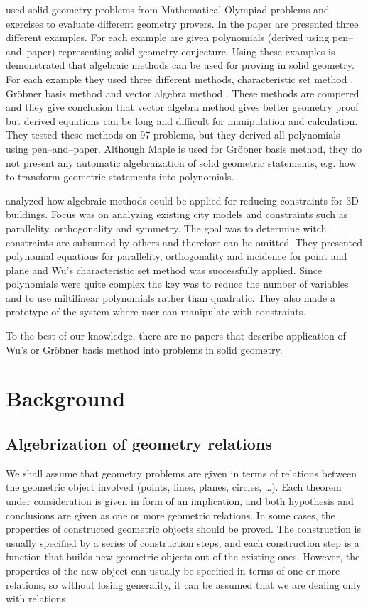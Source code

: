 \documentclass[final,1p,times,authoryear]{elsarticle}
\begin{document}
\cite{shao2016challenging} used solid geometry problems from
Mathematical Olympiad problems and exercises to evaluate different
geometry provers.  In the paper are presented three different
examples. For each example are given polynomials (derived using
pen--and--paper) representing solid geometry conjecture. Using these
examples is demonstrated that algebraic methods can be used for
proving in solid geometry. For each example they used three different
methods, characteristic set method \cite{wu}, Gr\"obner basis method
\cite{buchberger} and vector algebra method \cite{lord1985method}.
These methods are compered and they give conclusion that vector
algebra method gives better geometry proof but derived equations can
be long and difficult for manipulation and calculation. They tested
these methods on 97 problems, but they derived all polynomials using
pen--and--paper. Although Maple is used for Gr\"obner basis method,
they do not present any automatic algebraization of solid geometric
statements, e.g. how to transform geometric statements into
polynomials.

\cite{loch2009geometric} analyzed how algebraic methods could be
applied for reducing constraints for 3D buildings. Focus was on
analyzing existing city models and constraints such as parallelity,
orthogonality and symmetry.  The goal was to determine witch
constraints are subsumed by others and therefore can be omitted.  They
presented polynomial equations for parallelity, orthogonality and
incidence for point and plane and Wu's characteristic set method was
successfully applied. Since polynomials were quite complex the key was
to reduce the number of variables and to use miltilinear polynomials
rather than quadratic. They also made a prototype of the system where
user can manipulate with constraints.

To the best of our knowledge, there are no papers that describe
application of Wu's or Gr\"obner basis method into problems in solid
geometry.

\section{Background}
\subsection{Algebrization of geometry relations}
We shall assume that geometry problems are given in terms of relations
between the geometric object involved (points, lines, planes, circles,
\ldots). Each theorem under consideration is given in form of an
implication, and both hypothesis and conclusions are given as one or
more geometric relations. In some cases, the properties of constructed
geometric objects should be proved. The construction is usually
specified by a series of construction steps, and each construction
step is a function that builds new geometric objects out of the
existing ones. However, the properties of the new object can usually
be specified in terms of one or more relations, so without losing
generality, it can be assumed that we are dealing only with relations.
\end{document}
